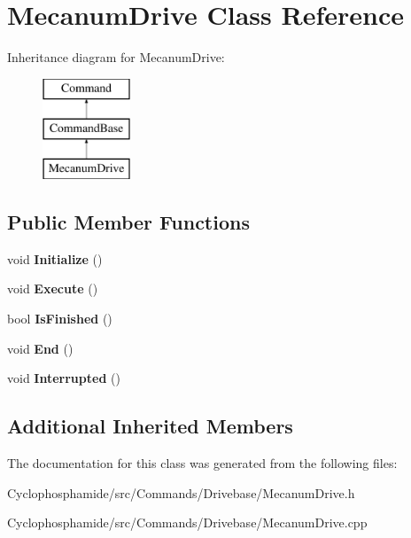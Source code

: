 \hypertarget{class_mecanum_drive}{}\section{Mecanum\+Drive Class Reference}
\label{class_mecanum_drive}
Inheritance diagram for Mecanum\+Drive\+:\begin{figure}[H]
\begin{center}
\leavevmode
\includegraphics[height=3.000000cm]{class_mecanum_drive}
\end{center}
\end{figure}
\subsection*{Public Member Functions}
\begin{DoxyCompactItemize}
\item 
\hypertarget{class_mecanum_drive_a3bb39fbfc65c1ab74bcb89cee858d324}{}void {\bfseries Initialize} ()\label{class_mecanum_drive_a3bb39fbfc65c1ab74bcb89cee858d324}

\item 
\hypertarget{class_mecanum_drive_aa36e8c7458c2187dbe0a9996c9faf71a}{}void {\bfseries Execute} ()\label{class_mecanum_drive_aa36e8c7458c2187dbe0a9996c9faf71a}

\item 
\hypertarget{class_mecanum_drive_a0da7dc004a592c49fe09eb4fc0e5cb26}{}bool {\bfseries Is\+Finished} ()\label{class_mecanum_drive_a0da7dc004a592c49fe09eb4fc0e5cb26}

\item 
\hypertarget{class_mecanum_drive_a50daee6870028ab2ec3f32ef4b3328be}{}void {\bfseries End} ()\label{class_mecanum_drive_a50daee6870028ab2ec3f32ef4b3328be}

\item 
\hypertarget{class_mecanum_drive_a2739d27b3ac9936bdd9277a9eddb6bd1}{}void {\bfseries Interrupted} ()\label{class_mecanum_drive_a2739d27b3ac9936bdd9277a9eddb6bd1}

\end{DoxyCompactItemize}
\subsection*{Additional Inherited Members}


The documentation for this class was generated from the following files\+:\begin{DoxyCompactItemize}
\item 
Cyclophosphamide/src/\+Commands/\+Drivebase/Mecanum\+Drive.\+h\item 
Cyclophosphamide/src/\+Commands/\+Drivebase/Mecanum\+Drive.\+cpp\end{DoxyCompactItemize}
